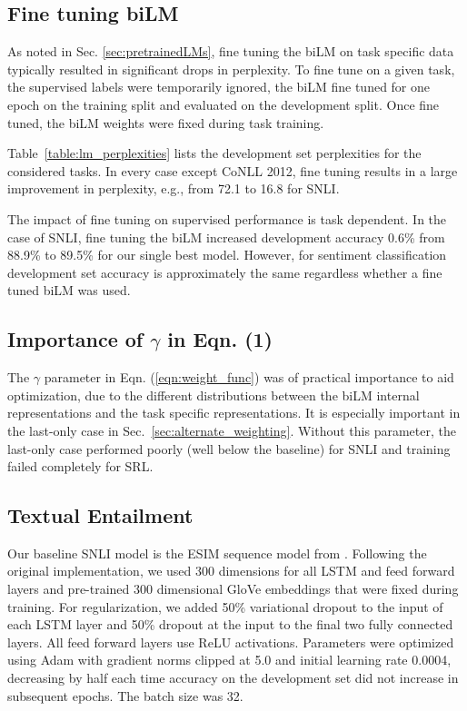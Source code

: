 \documentclass[11pt,a4paper]{article}
\begin{document}
\subsection{Fine tuning biLM}
As noted in Sec. \ref{sec:pretrainedLMs}, fine tuning the biLM on task specific data typically resulted in significant drops in perplexity.
To fine tune on a given task, the supervised labels were temporarily ignored, the biLM fine tuned for one epoch
on the training split and evaluated on the development split.
Once fine tuned, the biLM weights were fixed during task training.

Table~\ref{table:lm_perplexities} lists the development set perplexities for the considered tasks.   In every case except CoNLL 2012, fine tuning results in a large improvement in perplexity, e.g., from 72.1 to 16.8 for SNLI.

The impact of fine tuning on supervised performance is task dependent.
In the case of SNLI, fine tuning the biLM increased development accuracy 0.6\% from 88.9\% to 89.5\% for our single best model.
However, for sentiment classification development set accuracy is approximately the same regardless whether a fine tuned biLM was used.

\subsection{Importance of $\gamma$ in Eqn. (1)}
The $\gamma$ parameter in Eqn. (\ref{eqn:weight_func}) was of practical importance to aid optimization, due to the different distributions between the biLM internal representations and the task specific representations.
It is especially important in the last-only case in Sec.~\ref{sec:alternate_weighting}.  
Without this parameter, the last-only case performed poorly (well below the baseline) for SNLI and training failed completely for SRL.

\subsection{Textual Entailment}
Our baseline SNLI model is the ESIM sequence model from \citet{Chen2017EnhancedLF}.
Following the original implementation, we used 300 dimensions for all LSTM and feed forward layers and pre-trained 300 dimensional GloVe embeddings that were fixed during training.
For regularization, we added 50\% variational dropout \citep{Gal2016ATG} to the input of each LSTM layer and 50\% dropout \citep{Srivastava2014DropoutAS} at the input to the final two fully connected layers.  All feed forward layers use ReLU activations.
Parameters were optimized using Adam \citep{Kingma2014AdamAM} with gradient norms clipped at 5.0 and initial learning rate 0.0004, decreasing by half each time accuracy on the development set did not increase in subsequent epochs.  The batch size was 32.
\end{document}
